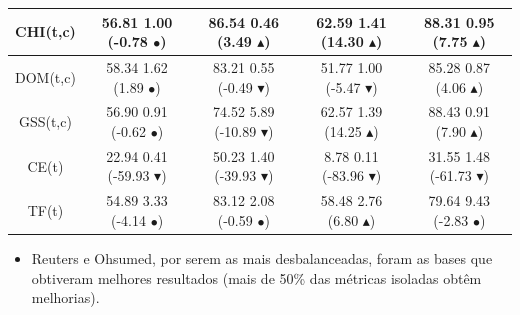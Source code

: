 \documentclass[10pt, red]{beamer}
\newcommand{\triangOK}{\textcolor[rgb]{00,0.45,0.10}{$\blacktriangle$}}
\newcommand{\triangBAD}{\textcolor[rgb]{0.7,00,00}{$\blacktriangledown$}}
\newcommand{\ball}{\textcolor[rgb]{0.7,0.70,0.0}{$\bullet$}}
\begin{document}
{\begin{table}[h]
\begin{adjustwidth}{-0.95cm}{-0.95cm}
\begin{tabular}{|c||c|c|c|c|}
\hline 
CHI(t,c)& 56.81 \textpm{} 1.00 (-0.78 \ball)& 86.54 \textpm{} 0.46 (3.49 \triangOK)& 62.59 \textpm{} 1.41 (14.30 \triangOK)& 88.31 \textpm{} 0.95 (7.75 \triangOK)\tabularnewline
\hline 
DOM(t,c)& 58.34 \textpm{} 1.62 (1.89 \ball)&  83.21 \textpm{} 0.55 (-0.49 \triangBAD)& 51.77 \textpm{} 1.00 (-5.47 \triangBAD)& 85.28 \textpm{} 0.87 (4.06 \triangOK)\tabularnewline
\hline 
GSS(t,c)& 56.90 \textpm{} 0.91 (-0.62 \ball)& 74.52 \textpm{} 5.89 (-10.89 \triangBAD)& 62.57 \textpm{} 1.39 (14.25 \triangOK)& 88.43 \textpm{} 0.91 (7.90 \triangOK)\tabularnewline
\hline 
CE(t)& 22.94 \textpm{} 0.41 (-59.93 \triangBAD)&  50.23 \textpm{} 1.40 (-39.93 \triangBAD)& 8.78 \textpm{} 0.11 (-83.96 \triangBAD)& 31.55 \textpm{} 1.48 (-61.73 \triangBAD)\tabularnewline
\hline 
TF(t)& 54.89 \textpm{} 3.33 (-4.14 \ball)& 83.12 \textpm{} 2.08 (-0.59 \ball)& 58.48 \textpm{} 2.76 (6.80 \triangOK)& 79.64 \textpm{} 9.43 (-2.83 \ball)\tabularnewline
\bottomrule
\end{tabular}
\end{adjustwidth}
\end{table}


\begin{itemize}
    \item Reuters e Ohsumed, por serem as mais desbalanceadas, foram as bases que obtiveram melhores resultados (mais de 50\% das métricas isoladas obtêm melhorias).
\end{itemize}

}

\end{document}
